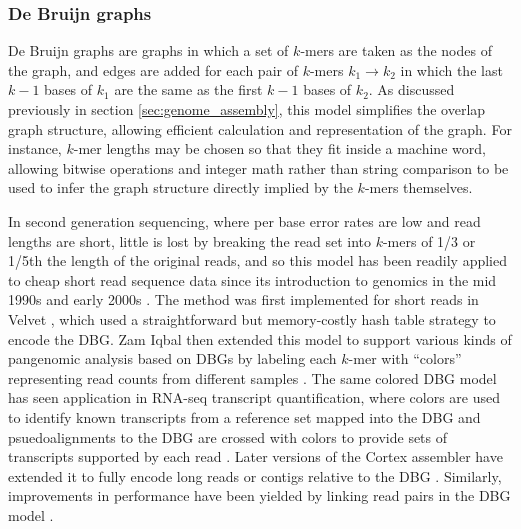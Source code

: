 \subsubsection{De Bruijn graphs}
\label{sec:de_bruijn_graphs}

De Bruijn graphs \cite{de1946combinatorial} are graphs in which a set of $k$-mers are taken as the nodes of the graph, and edges are added for each pair of $k$-mers $k_1 \rightarrow k_2$ in which the last $k-1$ bases of $k_1$ are the same as the first $k-1$ bases of $k_2$.
As discussed previously in section \ref{sec:genome_assembly}, this model simplifies the overlap graph structure, allowing efficient calculation and representation of the graph.
For instance, $k$-mer lengths may be chosen so that they fit inside a machine word, allowing bitwise operations and integer math rather than string comparison to be used to infer the graph structure directly implied by the $k$-mers themselves.

In second generation sequencing, where per base error rates are low and read lengths are short, little is lost by breaking the read set into $k$-mers of 1/3 or 1/5th the length of the original reads, and so this model has been readily applied to cheap short read sequence data since its introduction to genomics in the mid 1990s and early 2000s \cite{idury1995new,pevzner2001eulerian}.
The method was first implemented for short reads in Velvet \cite{zerbino2008velvet}, which used a straightforward but memory-costly hash table strategy to encode the DBG.
Zam Iqbal then extended this model to support various kinds of pangenomic analysis based on DBGs by labeling each $k$-mer with ``colors'' representing read counts from different samples \cite{iqbal2012novo}.
The same colored DBG model has seen application in RNA-seq transcript quantification, where colors are used to identify known transcripts from a reference set mapped into the DBG and psuedoalignments to the DBG are crossed with colors to provide sets of transcripts supported by each read \cite{bray2016near}.
Later versions of the Cortex assembler have extended it to fully encode long reads or contigs relative to the DBG \cite{turner2018integrating}.
Similarly, improvements in performance have been yielded by linking read pairs in the DBG model \cite{bankevich2012spades}.

